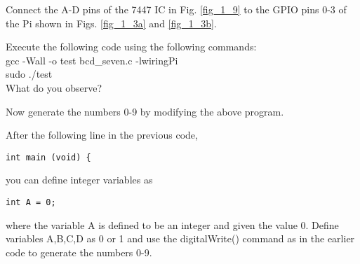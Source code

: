 
\begin{problem}
Connect the A-D pins of the 7447 IC  in Fig. \ref{fig_1_9} to the GPIO pins  0-3 of the Pi shown in Figs. \ref{fig_1_3a} and \ref{fig_1_3b}.
\end{problem}	
%
\begin{problem}
Execute the following code using the following commands:
\\
gcc -Wall -o test bcd\_seven.c -lwiringPi
\\
sudo ./test
\\
What do you observe?

\end{problem}
\begin{problem}
Now generate the numbers 0-9 by modifying the above program.
\end{problem}
\begin{problem}
After the following line in the previous code,
\begin{verbatim}
int main (void) {
\end{verbatim}
you can define integer variables as
\begin{verbatim}
int A = 0;
\end{verbatim}	
where the variable A is defined to be an integer and given the value 0.  Define variables A,B,C,D as 0 or 1 and use the digitalWrite() command as in the earlier code to generate the numbers 0-9.
\end{problem}
